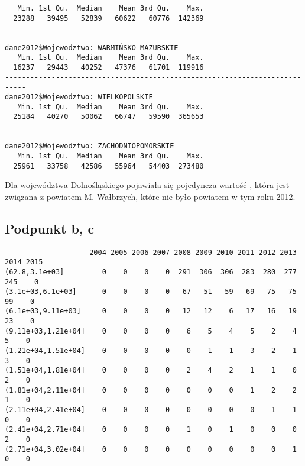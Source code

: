 \begin{verbatim}
   Min. 1st Qu.  Median    Mean 3rd Qu.    Max. 
  23288   39495   52839   60622   60776  142369 
--------------------------------------------------------------------------- 
dane2012$Wojewodztwo: WARMIŃSKO-MAZURSKIE
   Min. 1st Qu.  Median    Mean 3rd Qu.    Max. 
  16237   29443   40252   47376   61701  119916 
--------------------------------------------------------------------------- 
dane2012$Wojewodztwo: WIELKOPOLSKIE
   Min. 1st Qu.  Median    Mean 3rd Qu.    Max. 
  25184   40270   50062   66747   59590  365653 
--------------------------------------------------------------------------- 
dane2012$Wojewodztwo: ZACHODNIOPOMORSKIE
   Min. 1st Qu.  Median    Mean 3rd Qu.    Max. 
  25961   33758   42586   55964   54403  273480 

\end{verbatim}

Dla województwa Dolnośląskiego pojawiała się pojedyncza wartość , która
jest związana z powiatem M. Wałbrzych, które nie było powiatem w tym roku 2012.

\subsection*{Podpunkt b, c}


\begin{verbatim}
                    2004 2005 2006 2007 2008 2009 2010 2011 2012 2013 2014 2015
(62.8,3.1e+03]         0    0    0    0  291  306  306  283  280  277  245    0
(3.1e+03,6.1e+03]      0    0    0    0   67   51   59   69   75   75   99    0
(6.1e+03,9.11e+03]     0    0    0    0   12   12    6   17   16   19   23    0
(9.11e+03,1.21e+04]    0    0    0    0    6    5    4    5    2    4    5    0
(1.21e+04,1.51e+04]    0    0    0    0    0    1    1    3    2    1    3    0
(1.51e+04,1.81e+04]    0    0    0    0    2    4    2    1    1    0    2    0
(1.81e+04,2.11e+04]    0    0    0    0    0    0    0    1    2    2    1    0
(2.11e+04,2.41e+04]    0    0    0    0    0    0    0    0    1    1    0    0
(2.41e+04,2.71e+04]    0    0    0    0    1    0    1    0    0    0    2    0
(2.71e+04,3.02e+04]    0    0    0    0    0    0    0    0    0    1    0    0
\end{verbatim}



